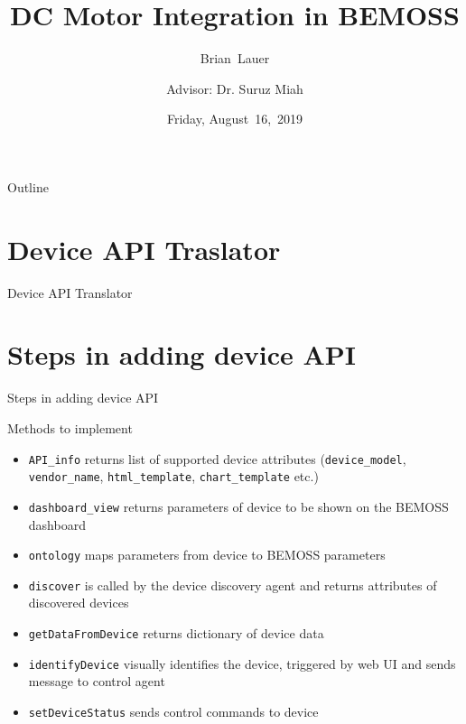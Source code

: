 \documentclass{beamer}
\title[DC Motor Integration]{DC Motor Integration in BEMOSS}
\author[B.~Lauer]{Brian~Lauer\\\and
Advisor: Dr. Suruz Miah}
\institute[Bradley University] %
{
  Department of Electrical and Computer Engineering\\
  Bradley University\\
  1501 W. Bradley Avenue\\
  Peoria, IL, 61625, USA
}
\date[August~16,~2019]{Friday, August~16,~2019}
\begin{document}
\begin{frame}
  \titlepage
\end{frame}

\begin{frame}{Outline}
  \tableofcontents
\end{frame}

\section{Device API Traslator}


\begin{frame}{Device API Translator}{}
\end{frame}

\section{Steps in adding device API}

\begin{frame}{Steps in adding device API}{}
\begin{block}{Methods to implement}
\begin{itemize}
	\item \texttt{API\_info} returns list of supported device attributes (\texttt{device\_model}, \texttt{vendor\_name}, \texttt{html\_template}, \texttt{chart\_template} etc.)
	\item \texttt{dashboard\_view} returns parameters of device to be shown on the BEMOSS dashboard
	\item \texttt{ontology} maps parameters from device to BEMOSS parameters
	\item \texttt{discover} is called by the device discovery agent and returns attributes of discovered devices
	\item \texttt{getDataFromDevice} returns dictionary of device data
	\item \texttt{identifyDevice} visually identifies the device, triggered by web UI and sends message to control agent
	\item \texttt{setDeviceStatus} sends control commands to device
\end{itemize}
\end{block}
\end{frame}
\end{document}
